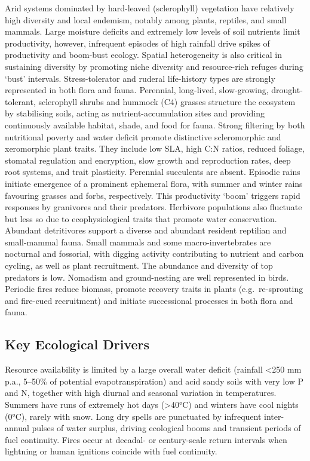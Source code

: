 \documentclass[
  letterpaper,
  DIV=11,
  numbers=noendperiod]{scrartcl}
\begin{document}
Arid systems dominated by hard-leaved (sclerophyll) vegetation have
relatively high diversity and local endemism, notably among plants,
reptiles, and small mammals. Large moisture deficits and extremely low
levels of soil nutrients limit productivity, however, infrequent
episodes of high rainfall drive spikes of productivity and boom-bust
ecology. Spatial heterogeneity is also critical in sustaining diversity
by promoting niche diversity and resource-rich refuges during `bust'
intervals. Stress-tolerator and ruderal life-history types are strongly
represented in both flora and fauna. Perennial, long-lived,
slow-growing, drought-tolerant, sclerophyll shrubs and hummock (C4)
grasses structure the ecosystem by stabilising soils, acting as
nutrient-accumulation sites and providing continuously available
habitat, shade, and food for fauna. Strong filtering by both nutritional
poverty and water deficit promote distinctive scleromorphic and
xeromorphic plant traits. They include low SLA, high C:N ratios, reduced
foliage, stomatal regulation and encryption, slow growth and
reproduction rates, deep root systems, and trait plasticity. Perennial
succulents are absent. Episodic rains initiate emergence of a prominent
ephemeral flora, with summer and winter rains favouring grasses and
forbs, respectively. This productivity `boom' triggers rapid responses
by granivores and their predators. Herbivore populations also fluctuate
but less so due to ecophysiological traits that promote water
conservation. Abundant detritivores support a diverse and abundant
resident reptilian and small-mammal fauna. Small mammals and some
macro-invertebrates are nocturnal and fossorial, with digging activity
contributing to nutrient and carbon cycling, as well as plant
recruitment. The abundance and diversity of top predators is low.
Nomadism and ground-nesting are well represented in birds. Periodic
fires reduce biomass, promote recovery traits in plants
(e.g.~re-sprouting and fire-cued recruitment) and initiate successional
processes in both flora and fauna.

\subsection{Key Ecological Drivers}\label{key-ecological-drivers-90}

Resource availability is limited by a large overall water deficit
(rainfall \textless250 mm p.a., 5--50\% of potential evapotranspiration)
and acid sandy soils with very low P and N, together with high diurnal
and seasonal variation in temperatures. Summers have runs of extremely
hot days (\textgreater40°C) and winters have cool nights (0°C), rarely
with snow. Long dry spells are punctuated by infrequent inter-annual
pulses of water surplus, driving ecological booms and transient periods
of fuel continuity. Fires occur at decadal- or century-scale return
intervals when lightning or human ignitions coincide with fuel
continuity.
\end{document}
